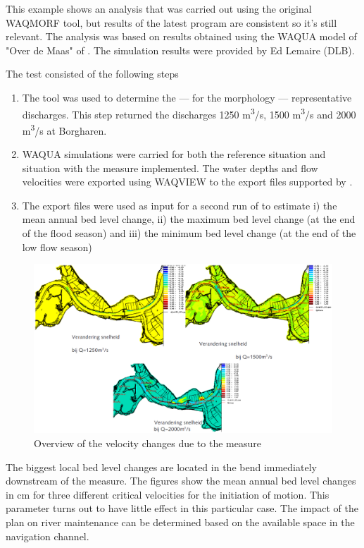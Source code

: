 This example shows an analysis that was carried out using the original WAQMORF tool, but results of the latest \dfastmi program are consistent so it's still relevant.
The analysis was based on results obtained using the WAQUA model of "Over de Maas" of \citep{Svasek2007}.
The simulation results were provided by Ed Lemaire (DLB).

The test consisted of the following steps

\begin{enumerate}
\item The tool \dfastmi was used to determine the --- for the morphology --- representative discharges.
This step returned the discharges 1250 m\textsuperscript{3}/s, 1500 m\textsuperscript{3}/s and 2000 m\textsuperscript{3}/s at Borgharen.

\item WAQUA simulations were carried for both the reference situation and situation with the measure implemented.
The water depths and flow velocities were exported using WAQVIEW to the export files supported by \dfastmi.

\item The export files were used as input for a second run of \dfastmi to estimate i) the mean annual bed level change, ii) the maximum bed level change (at the end of the flood season) and iii) the minimum bed level change (at the end of the low flow season)
\end{enumerate}

\begin{figure}
\includegraphics[width=\columnwidth]{figures/Fig13.png}
\caption{Overview of the velocity changes due to the measure}
\label{App.Fig13}
\end{figure}

The biggest local bed level changes are located in the bend immediately downstream of the measure.
The figures show the mean annual bed level changes in cm for three different critical velocities for the initiation of motion.
This parameter turns out to have little effect in this particular case.
The impact of the plan on river maintenance can be determined based on the available space in the navigation channel.

